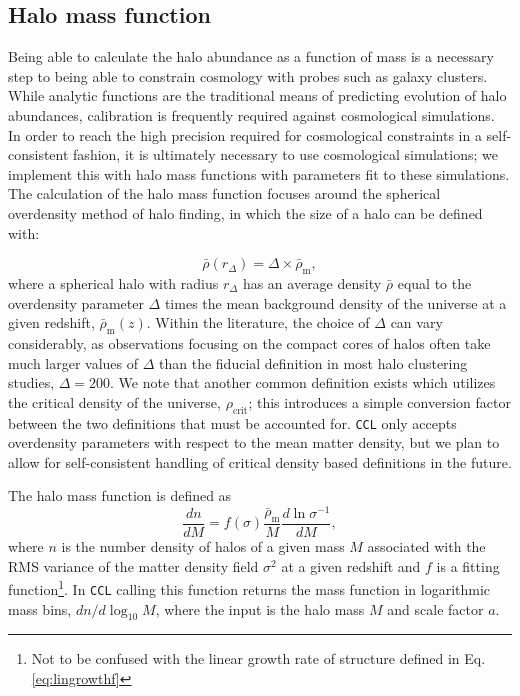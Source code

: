 \documentclass[\docopts]{\docclass}
\newcommand{\ccl}{{\tt CCL}\xspace}
\begin{document}
\subsection{Halo mass function}

Being able to calculate the halo abundance as a function of mass is a necessary step to being able to constrain cosmology with probes such as galaxy clusters. While analytic functions are the traditional means of predicting evolution of halo abundances, calibration is frequently required against cosmological simulations. In order to reach the high precision required for cosmological constraints in a self-consistent fashion, it is ultimately necessary to use cosmological simulations; we implement this with halo mass functions with parameters fit to these simulations. The calculation of the halo mass function focuses around the spherical overdensity method of halo finding, in which the size of a halo can be defined with:

\begin{equation}
\bar{\rho}(r_{\Delta}) = \Delta \times \bar{\rho}_{\mathrm{m}},
\end{equation}
%
where a spherical halo with radius $r_{\Delta}$ has an average density $\bar{\rho}$ equal to the overdensity parameter $\Delta$ times the mean background density of the universe at a given redshift, $\bar\rho_{\mathrm{m}}(z)$. Within the literature, the choice of $\Delta$ can vary considerably, as observations focusing on the compact cores of halos often take much larger values of $\Delta$ than the fiducial definition in most halo clustering studies, $\Delta = 200$. We note that another common definition exists which utilizes the critical density of the universe, $\rho_{\mathrm{crit}}$; this introduces a simple conversion factor between the two definitions that must be accounted for. \ccl only accepts overdensity parameters with respect to the mean matter density, but we plan to allow for self-consistent handling of critical density based definitions in the future.

The halo mass function is defined as
\begin{equation}
\frac{dn}{dM}=f(\sigma)\frac{\bar{\rho}_\mathrm{m}}{M}\frac{d\ln{\sigma^{-1}}}{dM},
\label{eq:halo_mass_function}
\end{equation}
where $n$ is the number density of halos of a given mass $M$ associated with the RMS variance of the matter density field $\sigma^2$ at a given redshift and $f$ is a fitting function\footnote{Not to be confused with the linear growth rate of structure defined in Eq. \ref{eq:lingrowthf}}. In \ccl calling this function returns the mass function in logarithmic mass bins, $dn/d\log_{10}{M}$, where the input is the halo mass $M$ and scale factor $a$.
\end{document}
